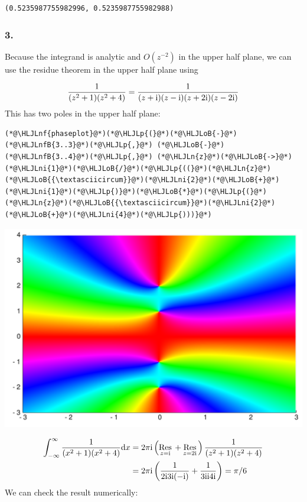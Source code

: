 \documentclass[12pt,a4paper]{article}
\newcommand{\HLJLn}[1]{#1}
\newcommand{\HLJLnf}[1]{\textcolor[RGB]{66,102,213}{#1}}
\newcommand{\HLJLnfB}[1]{\textcolor[RGB]{59,151,46}{#1}}
\newcommand{\HLJLni}[1]{\textcolor[RGB]{59,151,46}{#1}}
\newcommand{\HLJLoB}[1]{\textcolor[RGB]{102,102,102}{\textbf{#1}}}
\newcommand{\HLJLp}[1]{#1}
\def\D{ {\rm d} }
\def\I{ {\rm i} }
\def\Res_#1{\underset{#1}{\rm Res}\,}
\def\dx{\D x}
\begin{document}
\begin{lstlisting}
(0.5235987755982996, 0.5235987755982988)
\end{lstlisting}


\subsubsection{3.}
Because the integrand is analytic  and $O(z^{-2})$ in the upper half plane, we can use the residue theorem in the upper half plane using

\[
 {1 \over (z^2+1) (z^2 + 4)} = {1 \over (z+\I)(z-\I) (z+2\I)(z-2\I)}
\]
This has two poles in the upper half plane:


\begin{lstlisting}
(*@\HLJLnf{phaseplot}@*)(*@\HLJLp{(}@*)(*@\HLJLoB{-}@*)(*@\HLJLnfB{3..3}@*)(*@\HLJLp{,}@*) (*@\HLJLoB{-}@*)(*@\HLJLnfB{3..4}@*)(*@\HLJLp{,}@*) (*@\HLJLn{z}@*)(*@\HLJLoB{->}@*) (*@\HLJLni{1}@*)(*@\HLJLoB{/}@*)(*@\HLJLp{((}@*)(*@\HLJLn{z}@*)(*@\HLJLoB{{\textasciicircum}}@*)(*@\HLJLni{2}@*)(*@\HLJLoB{+}@*)(*@\HLJLni{1}@*)(*@\HLJLp{)}@*)(*@\HLJLoB{*}@*)(*@\HLJLp{(}@*)(*@\HLJLn{z}@*)(*@\HLJLoB{{\textasciicircum}}@*)(*@\HLJLni{2}@*)(*@\HLJLoB{+}@*)(*@\HLJLni{4}@*)(*@\HLJLp{)))}@*)
\end{lstlisting}

\includegraphics[width=\linewidth]{figures/Solutions1_6_1.pdf}


\begin{align*}
	\int_{-\infty}^\infty    {1 \over (x^2+1)(x^2+4)} \dx &=
    2 \pi \I \left( \Res_{z = \I} + \Res_{z = 2\I}\right){1 \over (z^2+1)(z^2+4)} \\
    & = 2 \pi \I \left( {1 \over 2 \I 3 \I (-\I)} + {1 \over 3 \I  \I 4\I} \right) = \pi/ 6
\end{align*}
We can check the result numerically:
\end{document}
